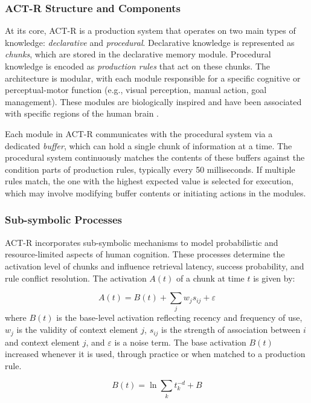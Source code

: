 \documentclass[12pt,a4paper]{article} %
\begin{document}
	\subsubsection*{ACT-R Structure and Components}
	At its core, ACT-R is a production system that operates on two main types of knowledge: \textit{declarative} and \textit{procedural}. Declarative knowledge is represented as \textit{chunks}, which are stored in the declarative memory module. Procedural knowledge is encoded as \textit{production rules} that act on these chunks. The architecture is modular, with each module responsible for a specific cognitive or perceptual-motor function (e.g., visual perception, manual action, goal management). These modules are biologically inspired and have been associated with specific regions of the human brain \parencite{anderson_how_2007}.

	Each module in ACT-R communicates with the procedural system via a dedicated \textit{buffer}, which can hold a single chunk of information at a time. The procedural system continuously matches the contents of these buffers against the condition parts of production rules, typically every 50 milliseconds. If multiple rules match, the one with the highest expected value is selected for execution, which may involve modifying buffer contents or initiating actions in the modules.

	\subsubsection*{Sub-symbolic Processes}
	ACT-R incorporates sub-symbolic mechanisms to model probabilistic and resource-limited aspects of human cognition. These processes determine the activation level of chunks and influence retrieval latency, success probability, and rule conflict resolution. The activation $A(t)$ of a chunk at time $t$ is given by:

	\begin{equation}
	A(t) = B(t) + \sum_j w_j s_{ij} + \varepsilon
	\end{equation}
	where $B(t)$ is the base-level activation reflecting recency and frequency of use, $w_j$ is the validity of context element $j$, $s_{ij}$ is the strength of association between $i$ and context element $j$, and $\varepsilon$ is a noise term. 
	The base activation $B(t)$ increased whenever it is used, through practice or when matched to a production rule.

	\begin{equation}
		B(t) = \ln \sum_{k}t_k^{-d} + B  
	\end{equation}
\end{document}
